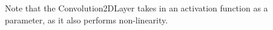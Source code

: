 \documentclass[%
oneside,                 %
final,                   %
10pt]{article}
\begin{document}
Note that the Convolution2DLayer takes in an activation function as a parameter, as it also performs non-linearity.
\end{document}
